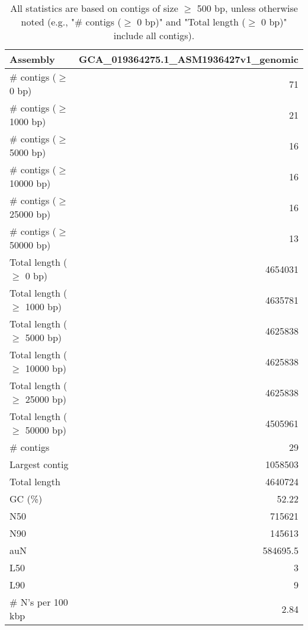 \documentclass[12pt,a4paper]{article}
\begin{document}
\begin{table}[ht]
\begin{center}
\caption{All statistics are based on contigs of size $\geq$ 500 bp, unless otherwise noted (e.g., "\# contigs ($\geq$ 0 bp)" and "Total length ($\geq$ 0 bp)" include all contigs).}
\begin{tabular}{|l*{1}{|r}|}
\hline
Assembly & GCA\_019364275.1\_ASM1936427v1\_genomic \\ \hline
\# contigs ($\geq$ 0 bp) & 71 \\ \hline
\# contigs ($\geq$ 1000 bp) & 21 \\ \hline
\# contigs ($\geq$ 5000 bp) & 16 \\ \hline
\# contigs ($\geq$ 10000 bp) & 16 \\ \hline
\# contigs ($\geq$ 25000 bp) & 16 \\ \hline
\# contigs ($\geq$ 50000 bp) & 13 \\ \hline
Total length ($\geq$ 0 bp) & 4654031 \\ \hline
Total length ($\geq$ 1000 bp) & 4635781 \\ \hline
Total length ($\geq$ 5000 bp) & 4625838 \\ \hline
Total length ($\geq$ 10000 bp) & 4625838 \\ \hline
Total length ($\geq$ 25000 bp) & 4625838 \\ \hline
Total length ($\geq$ 50000 bp) & 4505961 \\ \hline
\# contigs & 29 \\ \hline
Largest contig & 1058503 \\ \hline
Total length & 4640724 \\ \hline
GC (\%) & 52.22 \\ \hline
N50 & 715621 \\ \hline
N90 & 145613 \\ \hline
auN & 584695.5 \\ \hline
L50 & 3 \\ \hline
L90 & 9 \\ \hline
\# N's per 100 kbp & 2.84 \\ \hline
\end{tabular}
\end{center}
\end{table}
\end{document}
